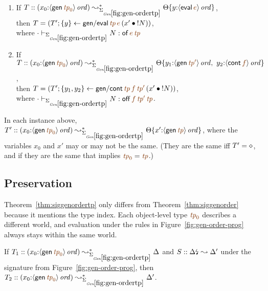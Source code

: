 \bigskip
\begin{lemma}~
\begin{enumerate}
\item If 
   $T :: (x_0{:}\istrue{\susp{{\sf gen}\,\lf{{\it tp}_0}}}) 
         \leadsto^*_{\siggenordertp}
         \tackon{\Theta}{y{:}\istrue{\susp{{\sf eval}\,\lf{e}}}}$,
\\ then 
   $T = \left(T'; \trstep{y}{{\sf gen/eval}\,\lf{{\it tp}}\,\lf{e}\,(\tfuser{x'}{\tbangr{N}})}\right)$,
\\ where $\cdot \vdash_{\siggenordertp} N : {\sf of}\,\lf{e}\,\lf{{\it tp}}$
\medskip
\item If 
   $T :: (x_0{:}\istrue{\susp{{\sf gen}\,\lf{{\it tp}_0}}})
         \leadsto^*_{\siggenordertp}
         \tackon{\Theta}{y_1{:}\istrue{\susp{{\sf gen}\,\lf{{\it tp}'}}}, ~
                         y_2{:}\istrue{\susp{{\sf cont}\,\lf{f}}}}$,
\\ then 
   $T = \left(T'; \trstep{y_1,y_2}{{\sf gen/cont}\,\lf{{\it tp}}\,\lf{f}\,\lf{{\it tp}'}\,(\tfuser{x'}{\tbangr{N}})}\right)$,
\\ where 
   $\cdot \vdash_{\siggenordertp} N : {{{\sf off}\,\lf{f}\,\lf{{\it tp}'}\,\lf{{\it tp}}}}$.
\medskip
\end{enumerate}
In each instance above, 
$T' :: (x_0{:}\istrue{\susp{{\sf gen}\,\lf{{\it tp}_0}}}) \leadsto^*_{\siggenordertp}
          \tackon{\Theta}{x'{:}\istrue{\susp{{\sf gen}\,\lf{{\it tp}}}}}$,
where the variables $x_0$ and $x'$ may or may not
be the same. (They are the same iff $T' = \diamond$, and if they
are the same that implies $\lf{{\it tp}_0} = \lf{{\it tp}}$.)
\end{lemma}
\bigskip



\subsection{Preservation}


Theorem~\ref{thm:siggenordertp} only differs from
Theorem~\ref{thm:siggenorder} because it mentions the type index.
Each object-level type $\lf{{\it tp}_0}$ describes a different world,
and evaluation under the rules in Figure~\ref{fig:gen-order-prog}
always stays within the same world.

\bigskip
\begin{theorem}
\label{thm:siggenordertp}
If $T_1 :: (x_0{:}\istrue{\susp{{\sf gen}\,\lf{{\it tp}_0}}}) \leadsto^*_{\siggenordertp} 
   \Delta$ and $S :: {\Delta}{\mbox{\lightning}}_{} \leadsto \Delta'$
under the signature from Figure~\ref{fig:gen-order-prog}, then
$T_2 :: (x_0{:}\istrue{\susp{{\sf gen}\,\lf{{\it tp}_0}}}) \leadsto^*_{\siggenordertp} 
   \Delta'$.
\end{theorem}

